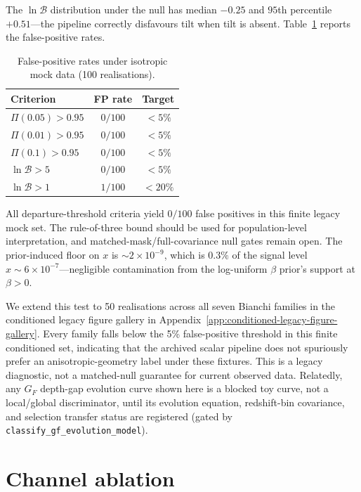 The $\ln\mathcal{B}$ distribution under the null has
median $-0.25$ and $95$th percentile $+0.51$---the pipeline
correctly disfavours tilt when tilt is absent.
Table~\ref{tab:null-fp} reports the false-positive rates.

\begin{table}[t]
\caption{False-positive rates under isotropic mock data
  (100 realisations).}
\label{tab:null-fp}
\centering\small
\begin{tabular}{lcc}
\hline\hline
Criterion & FP rate & Target \\
\hline
$\Pi(0.05) > 0.95$ & $0/100$ & $< 5\%$ \\
$\Pi(0.01) > 0.95$ & $0/100$ & $< 5\%$ \\
$\Pi(0.1) > 0.95$  & $0/100$ & $< 5\%$ \\
$\ln\mathcal{B} > 5$      & $0/100$ & $< 5\%$ \\
$\ln\mathcal{B} > 1$      & $1/100$ & $< 20\%$ \\
\hline\hline
\end{tabular}
\end{table}

All departure-threshold criteria yield $0/100$ false positives in
this finite legacy mock set.  The rule-of-three bound should be used
for population-level interpretation, and matched-mask/full-covariance
null gates remain open.
The prior-induced floor on $x$ is
$\sim 2 \times 10^{-9}$, which is $0.3\%$ of the signal level
$x \sim 6 \times 10^{-7}$---negligible contamination from the
log-uniform $\beta$ prior's support at $\beta > 0$.

We extend this test to 50 realisations across all seven Bianchi
families in the conditioned legacy figure gallery in Appendix~\ref{app:conditioned-legacy-figure-gallery}.
Every family falls below the 5\% false-positive threshold in this
finite conditioned set, indicating that the archived scalar pipeline
does not spuriously prefer an anisotropic-geometry label under these
fixtures.  This is a legacy diagnostic, not a matched-null guarantee
for current observed data.  Relatedly, any $G_F$ depth-gap evolution
curve shown here is a blocked toy curve, not a local/global
discriminator, until its evolution equation, redshift-bin
covariance, and selection transfer status are registered (gated by
\texttt{classify\_gf\_evolution\_model}).


\section{Channel ablation}\label{sec:ablation}

